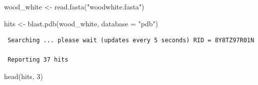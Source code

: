 \documentclass[
  letterpaper,
  DIV=11,
  numbers=noendperiod]{scrartcl}
\newenvironment{Shaded}{\begin{snugshade}}{\end{snugshade}}
\newcommand{\AttributeTok}[1]{\textcolor[rgb]{0.40,0.45,0.13}{#1}}
\newcommand{\DecValTok}[1]{\textcolor[rgb]{0.68,0.00,0.00}{#1}}
\newcommand{\FunctionTok}[1]{\textcolor[rgb]{0.28,0.35,0.67}{#1}}
\newcommand{\NormalTok}[1]{\textcolor[rgb]{0.00,0.23,0.31}{#1}}
\newcommand{\OtherTok}[1]{\textcolor[rgb]{0.00,0.23,0.31}{#1}}
\newcommand{\StringTok}[1]{\textcolor[rgb]{0.13,0.47,0.30}{#1}}
\begin{document}
\begin{Shaded}
\begin{Highlighting}[]
\NormalTok{wood\_white }\OtherTok{\textless{}{-}} \FunctionTok{read.fasta}\NormalTok{(}\StringTok{"woodwhite.fasta"}\NormalTok{)}

\NormalTok{hits }\OtherTok{\textless{}{-}} \FunctionTok{blast.pdb}\NormalTok{(wood\_white, }\AttributeTok{database =} \StringTok{"pdb"}\NormalTok{)}
\end{Highlighting}
\end{Shaded}

\begin{verbatim}
 Searching ... please wait (updates every 5 seconds) RID = 8Y8TZ97R01N 
 
 Reporting 37 hits
\end{verbatim}

\begin{Shaded}
\begin{Highlighting}[]
\FunctionTok{head}\NormalTok{(hits, }\DecValTok{3}\NormalTok{)}
\end{Highlighting}
\end{Shaded}
\end{document}
